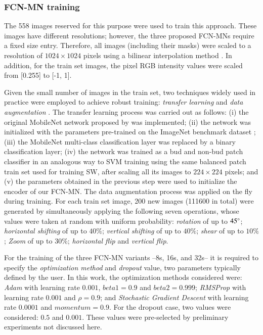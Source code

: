 \documentclass[a4paper,authoryear,review]{elsarticle}
\begin{document}
	\subsubsection{FCN-MN training}
	\label{sec:fcntrain}
	
	The 558 images reserved for this purpose were used to train this approach. These images have different resolutions; however, the three proposed FCN-MNs require a fixed size entry. Therefore, all images (including their masks) were scaled to a resolution of $1024 \times 1024$ pixels using a bilinear interpolation method \citep{han2013comparison}. In addition, for the train set images, the pixel RGB intensity values were scaled from [0.255] to [-1, 1].
	
	Given the small number of images in the train set, two techniques widely used in practice were employed to achieve robust training: \emph{transfer learning} \citep{pan2009survey} and \emph{data augmentation} \citep{shorten2019survey}. The transfer learning process was carried out as follows: (i) the original  MobileNet network proposed by \citet{howard2017mobilenets} was implemented; (ii) the network was initialized with the parameters pre-trained on the ImageNet benchmark dataset \citep{kornblith2019better}; (iii) the MobileNet multi-class classification layer was replaced by a binary classification layer; (iv) the network was trained as a bud and non-bud patch classifier in an analogous way to SVM training using the same balanced patch train set used for training SW, after scaling all its images to $224 \times 224$ pixels; and (v) the parameters obtained in the previous step were used to initialize the encoder of our FCN-MN. The data augmentation process was applied on the fly during training. For each train set image, 200 new images (111600 in total) were generated by simultaneously applying the following seven operations, whose values were taken at random with uniform probability: \emph{rotation} of up to $45\degree$; \emph{horizontal shifting} of up to $40\%$; \emph{vertical shifting} of up to $40\%$; \emph{shear} of up to $10\%$; \emph{Zoom} of up to $30\%$;  \emph{horizontal flip} and \emph{vertical flip}. 
	
	For the training of the three  FCN-MN variants --8s, 16s, and 32s-- it is required to specify the \emph{optimization method} and \emph{dropout} value, two parameters typically defined by the user. In this work, the optimization methods considered were: \emph{Adam} with learning rate $0.001$, $beta1 = 0.9$ and $beta2 = 0.999$; \emph{RMSProp} with learning rate $0.001$ and $\rho = 0.9$; and \emph{Stochastic Gradient Descent} with learning rate $0.0001$ and $momentum = 0.9$. For the dropout case, two values were considered: $0.5$ and $0.001$. These values were pre-selected by preliminary experiments not discussed here.
	
\end{document}
